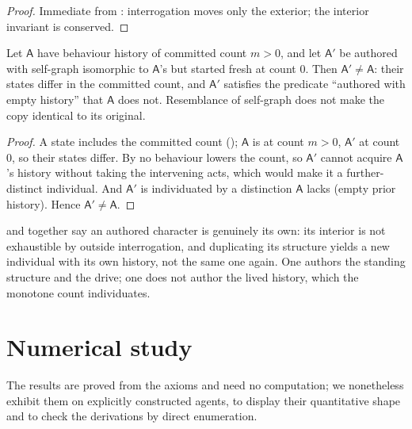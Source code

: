 \documentclass[11pt,twocolumn,a4paper]{article}
\newcommand{\Agent}{\mathsf{A}}
\begin{document}
\begin{proof}
Immediate from : interrogation moves only the
exterior; the interior invariant is conserved.
\end{proof}

\begin{theorem}
\label{thm:copy}
Let $\Agent$ have behaviour history of committed count $m>0$, and let
$\Agent'$ be authored with self-graph isomorphic to $\Agent$'s but started
fresh at count $0$. Then $\Agent'\neq\Agent$: their states differ in the
committed count, and $\Agent'$ satisfies the predicate ``authored with
empty history'' that $\Agent$ does not. Resemblance of self-graph does not
make the copy identical to its original.
\end{theorem}

\begin{proof}
A state includes the committed count (); $\Agent$ is at
count $m>0$, $\Agent'$ at count $0$, so their states differ. By
 no behaviour lowers the count, so $\Agent'$ cannot
acquire $\Agent$'s history without taking the intervening acts, which
would make it a further-distinct individual. And $\Agent'$ is individuated
by a distinction $\Agent$ lacks (empty prior history). Hence
$\Agent'\neq\Agent$.
\end{proof}

\begin{remark}
 and  together say an authored
character is genuinely its own: its interior is not exhaustible by outside
interrogation, and duplicating its structure yields a new individual with
its own history, not the same one again. One authors the standing
structure and the drive; one does not author the lived history, which the
monotone count individuates.
\end{remark}

\section{Numerical study}
\label{sec:validation}

The results are proved from the axioms and need no computation; we
nonetheless exhibit them on explicitly constructed agents, to display
their quantitative shape and to check the derivations by direct
enumeration.
\end{document}
